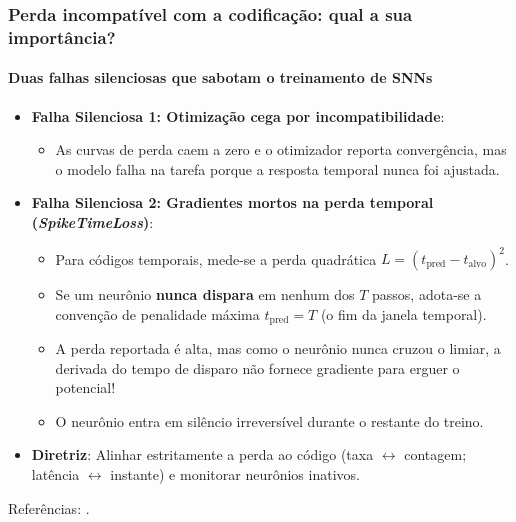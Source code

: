 \begin{frame}
	\frametitle{Perda incompatível com a codificação: qual a sua importância?}
	\framesubtitle{Duas falhas silenciosas que sabotam o treinamento de SNNs}
	\footnotesize
	\begin{itemize}
		\setlength{\itemsep}{2pt}
		\item \textbf{Falha Silenciosa 1: Otimização cega por incompatibilidade}:
		\begin{itemize}
			\item As curvas de perda caem a zero e o otimizador reporta convergência, mas o modelo falha na tarefa porque a resposta temporal nunca foi ajustada.
		\end{itemize}
		\item \textbf{Falha Silenciosa 2: Gradientes mortos na perda temporal (\textit{SpikeTimeLoss})}:
		\begin{itemize}
			\item Para códigos temporais, mede-se a perda quadrática $L = (t_{\mathrm{pred}} - t_{\mathrm{alvo}})^2$.
			\item Se um neurônio \textbf{nunca dispara} em nenhum dos $T$ passos, adota-se a convenção de penalidade máxima $t_{\mathrm{pred}} = T$ (o fim da janela temporal).
			\item A perda reportada é alta, mas como o neurônio nunca cruzou o limiar, a derivada do tempo de disparo não fornece gradiente para erguer o potencial!
			\item O neurônio entra em silêncio irreversível durante o restante do treino.
		\end{itemize}
		\item \textbf{Diretriz}: Alinhar estritamente a perda ao código (taxa $\leftrightarrow$ contagem; latência $\leftrightarrow$ instante) e monitorar neurônios inativos.
	\end{itemize}
	\par\vfill{\tiny Referências: \cite{eshraghian2023training, liu2023firstspike}.}
\end{frame}
